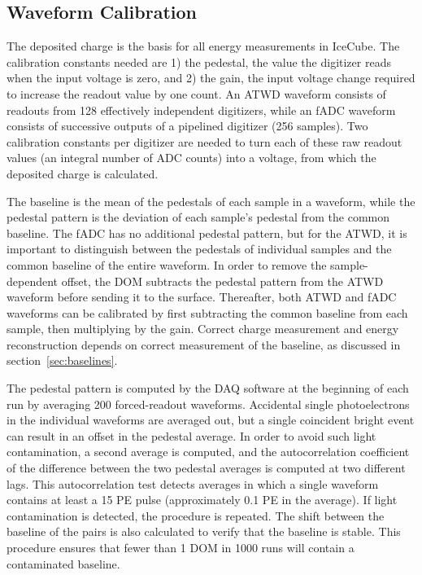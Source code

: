 \subsection{\label{sec:waveformcal}Waveform Calibration}

The deposited charge is the basis for all energy measurements in IceCube. The
calibration constants needed are 1) the pedestal, the value the digitizer
reads when the input voltage is zero, and 2) the gain, the input voltage change
required to increase the readout value by one count.  An ATWD waveform
consists of readouts from 128 effectively independent 
digitizers, while an fADC waveform consists of successive outputs of a 
pipelined digitizer (256 samples). Two calibration constants per digitizer are needed to turn each of these
raw readout values (an integral number of ADC counts) into a
voltage, from which the deposited charge is calculated.

The baseline is the mean of the pedestals of each sample in a waveform, while the pedestal pattern is
the deviation of each sample's pedestal from the common baseline.  The fADC
has no additional pedestal pattern, but for the ATWD, it is important to distinguish
between the pedestals of individual samples 
and the common baseline of the entire waveform.  In order to remove the
sample-dependent offset, the DOM subtracts the pedestal pattern from
the ATWD waveform before sending it to the surface.  Thereafter, both ATWD
and fADC waveforms can be calibrated by first subtracting the common
baseline from each sample, then multiplying by the gain. Correct charge
measurement and energy reconstruction depends on correct measurement
of the baseline, as discussed in section~\ref{sec:baselines}.

The pedestal pattern is computed by the DAQ software at the beginning of each 
run by averaging 200 forced-readout waveforms.  Accidental single photoelectrons in
the individual waveforms are averaged out, but a single coincident bright event can
result in an offset in the pedestal average.  In order to avoid such
light contamination, a second average is computed, and the
autocorrelation coefficient of the difference between the two pedestal
averages is computed at two different lags.  This autocorrelation test detects averages in which a
single waveform contains at least a 15 PE pulse (approximately 0.1 PE in the
average).  If light contamination is detected, the procedure is repeated.
The shift between the baseline of the pairs is also calculated to verify
that the baseline is stable.  This procedure ensures that fewer than 1 DOM
in 1000 runs will contain a contaminated baseline.

